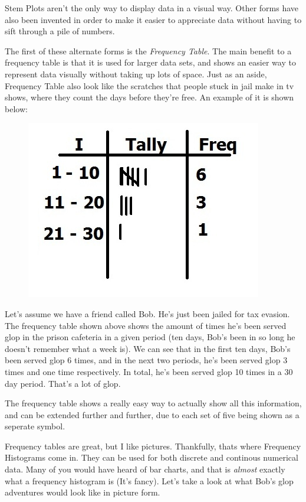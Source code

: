 \documentclass[11pt]{article}
\begin{document}
Stem Plots aren't the only way to display data in a visual way. Other forms have also been invented in order to make it easier to appreciate data without having to sift through a pile of numbers.

The first of these alternate forms is the \emph{Frequency Table}. The main benefit to a frequency table is that it is used for larger data sets, and shows an easier way to represent data visually without taking up lots of space. Just as an aside, Frequency Table also look like the scratches that people stuck in jail make in tv shows, where they count the days before they're free. An example of it is shown below:

\begin{figure}[htp]
\centering
\includegraphics[scale=1.00]{FreqTableImage3.jpg}
\end{figure}

Let's assume we have a friend called Bob. He's just been jailed for tax evasion. The frequency table shown above shows the amount of times he's been served glop in the prison cafeteria in a given period (ten days, Bob's been in so long he doesn't remember what a week is). We can see that in the first ten days, Bob's been served glop 6 times, and in the next two periods, he's been served glop 3 times and one time respectively. In total, he's been served glop 10 times in a 30 day period. That's a lot of glop. 

The frequency table shows a really easy way to actually show all this information, and can be extended further and further, due to each set of five being shown as a seperate symbol. 

Frequency tables are great, but I like pictures. Thankfully, thats where Frequency Histograms come in. They can be used for both discrete and continous numerical data. Many of you would have heard of bar charts, and that is \emph{almost} exactly what a frequency histogram is (It's fancy). Let's take a look at what Bob's glop adventures would look like in picture form.
\end{document}
